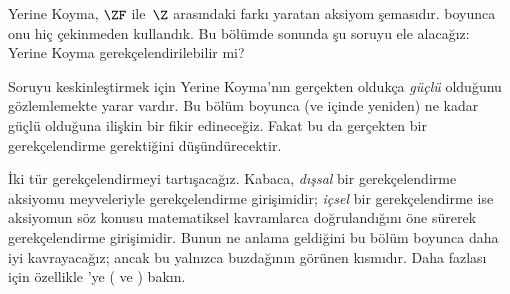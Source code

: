 


Yerine Koyma, $\ZF$ ile~$\Z$ arasındaki farkı yaratan aksiyom şemasıdır.
 boyunca onu hiç çekinmeden
kullandık. Bu bölümde sonunda şu soruyu ele alacağız: Yerine Koyma
gerekçelendirilebilir mi?

Soruyu keskinleştirmek için Yerine Koyma'nın gerçekten oldukça
\emph{güçlü} olduğunu gözlemlemekte yarar vardır. Bu bölüm boyunca (ve
 içinde yeniden) ne kadar güçlü
olduğuna ilişkin bir fikir edineceğiz. Fakat bu da gerçekten bir
gerekçelendirme gerektiğini düşündürecektir.

İki tür gerekçelendirmeyi tartışacağız. Kabaca, \emph{dışsal} bir
gerekçelendirme aksiyomu meyveleriyle gerekçelendirme girişimidir;
\emph{içsel} bir gerekçelendirme ise aksiyomun söz konusu matematiksel
kavramlarca doğrulandığını öne sürerek gerekçelendirme girişimidir. Bunun ne
anlama geldiğini bu bölüm boyunca daha iyi kavrayacağız; ancak bu yalnızca
buzdağının görünen kısmıdır. Daha fazlası için özellikle
\citeauthor{Maddy1988a}'ye (\citeyear{Maddy1988a} ve
\citeyear{Maddy1988b}) bakın.

